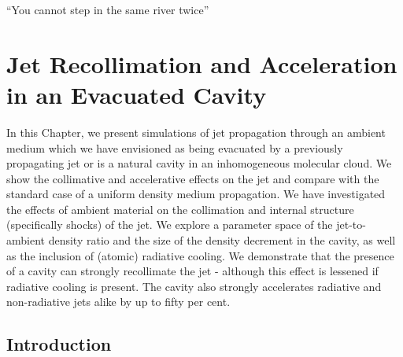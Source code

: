 \begin{savequote}
``You cannot step in the same river twice''
\end{savequote}


\chapter{Jet Recollimation and Acceleration in an Evacuated Cavity} 
\label{JetRecollimationandAccelerationinanEvacuatedCavity}

In this Chapter, we present simulations of jet propagation through an
ambient medium which we have envisioned as being evacuated by a previously
propagating jet or is a natural cavity in an inhomogeneous molecular cloud.
We show the collimative and accelerative
effects on the jet and compare with the standard case of a uniform
density medium propagation.  We have investigated the effects of ambient
material on the collimation and internal structure (specifically shocks)
of the jet.
We explore a parameter space of the jet-to-ambient
density ratio and the size of the density decrement
in the cavity, as well as the inclusion of (atomic) radiative cooling.
We demonstrate that the presence of a cavity can strongly recollimate the jet -
although this effect is lessened if radiative cooling is present.
The cavity also strongly accelerates radiative and non-radiative jets alike by
up to fifty per cent.


\section{Introduction}

